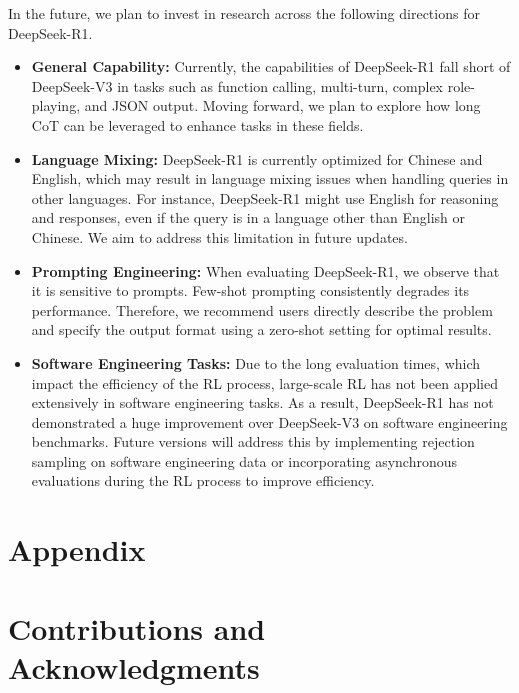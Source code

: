 \documentclass[11pt, a4paper, logo, copyright, nonumbering]{deepseek}
\newcommand{\dsri}{DeepSeek-R1}
\begin{document}
{In the future, we plan to invest in research across the following directions for \dsri{}.
\begin{itemize}[topsep=0pt]
    \item \textbf{General Capability:}
  Currently, the capabilities of \dsri{} fall short of DeepSeek-V3 in tasks such as function calling, multi-turn, complex role-playing, and JSON output. Moving forward, we plan to explore how long CoT can be leveraged to enhance tasks in these fields.
    \item \textbf{Language Mixing:}
\dsri{} is currently optimized for Chinese and English, which may result in language mixing issues when handling queries in other languages. For instance, \dsri{} might use English for reasoning and responses, even if the query is in a language other than English or Chinese. We aim to address this limitation in future updates.
 \item \textbf{Prompting Engineering:} When evaluating \dsri{}, we observe that it is sensitive to prompts. Few-shot prompting consistently degrades its performance. Therefore, we recommend users directly describe the problem and specify the output format using a zero-shot setting for optimal results.
\item  \textbf{Software Engineering Tasks:}
Due to the long evaluation times, which impact the efficiency of the RL process, large-scale RL has not been applied extensively in software engineering tasks. As a result, DeepSeek-R1 has not demonstrated a huge improvement over DeepSeek-V3 on software engineering benchmarks. Future versions will address this by implementing rejection sampling on software engineering data or incorporating asynchronous evaluations during the RL process to improve efficiency.
    
\end{itemize}



\newpage
\appendix

\section*{Appendix}

\section{Contributions and Acknowledgments}


}
\end{document}
